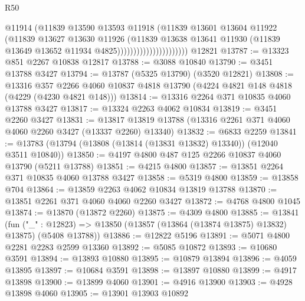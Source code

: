 \begin{lexlean}{R50}
\begin{coremodule}
                                      @11914
                                      (@11839
                                        @13590
                                        @13593
                                        @11918
                                        (@11839
                                          @13601
                                          @13604
                                          @11922
                                          (@11839
                                            @13627
                                            @13630
                                            @11926
                                            (@11839
                                              @13638
                                              @13641
                                              @11930
                                              (@11839
                                                @13649
                                                @13652
                                                @11934
                                                @4825))))))))))))))))))))))
    @12821
@13787 := @13323 @851 @2267 @10838 @12817
@13788 := @3088 @10840
@13790 := @3451 @13788 @3427
@13794 := @13787 (@5325 @13790) (@3520 @12821)
@13808 := @13316
    @357
    @2266
    @4060
    @10837
    @4818
    @13790
    (@4224 @4821 @148 @4818 (@4229 (@4230 @4821 @148)))
@13814 := @13316 @2264 @371 @10835 @4060 @13788 @3427
@13817 := @13324 @2263 @4062 @10834
@13819 := @3451 @2260 @3427
@13831 := @13817 @13819 @13788 (@13316 @2261 @371 @4060 @4060 @2260 @3427 (@13337 @2260) @13340)
@13832 := @6833 @2259
@13841 := @13783 (@13794 (@13808 (@13814 (@13831 @13832) @13340)) (@12040 @3511 @10840))
@13850 := @4197 @4800 @487 @125 @2266 @10837 @4060 @13790 (@5211 @13788)
@13851 := @4215 @4800
@13857 := @13851 @2264 @371 @10835 @4060 @13788 @3427
@13858 := @5319 @4800
@13859 := @13858 @704
@13864 := @13859 @2263 @4062 @10834 @13819 @13788
@13870 := @13851 @2261 @371 @4060 @4060 @2260 @3427
@13872 := @4768 @4800 @1045
@13874 := @13870 (@13872 @2260)
@13875 := @4309 @4800
@13885 := @13841
    (fun ("_" : @12823) => @13850 (@13857 (@13864 (@13874 @13875) @13832) @13875) (@5408 @13788))
@13886 := @12822 @5196
@13891 := @5071 @4800 @2281 @2283 @2599 @13360
@13892 := @5085 @10872
@13893 := @10680 @3591
@13894 := @13893 @10880
@13895 := @10879 @13894
@13896 := @4059 @13895
@13897 := @10684 @3591
@13898 := @13897 @10880
@13899 := @4917 @13898
@13900 := @13899 @4060
@13901 := @4916 @13900
@13903 := @4928 @13898 @4060
@13905 := @13901 @13903 @10892

\end{coremodule}
\end{lexlean}
